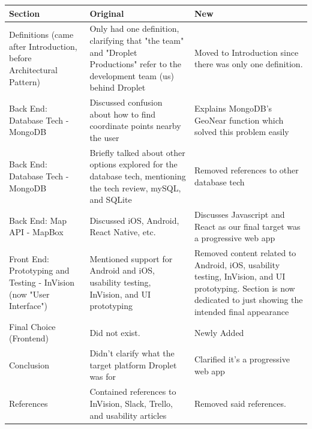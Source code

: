 \documentclass[draftclsnofoot, onecolumn, letterpaper,10pt,compsoc]{IEEEtran}
\begin{document}
\begin{tabularx}{\columnwidth}{X|X|X}
\textbf{Section} & \textbf{Original} & \textbf{New} \\ 
\hline

Definitions (came after Introduction, before Architectural Pattern) & 
Only had one definition, clarifying that "the team" and "Droplet Productions" refer to the development team (us) behind Droplet  & 
Moved to Introduction since there was only one definition. 
\\ \hline 

Back End: Database Tech - MongoDB  &
Discussed confusion about how to find coordinate points nearby the user &
Explains MongoDB's GeoNear function which solved this problem easily 
\\ \hline

Back End: Database Tech - MongoDB &
Briefly talked about other options explored for the database tech, mentioning the tech review, mySQL, and SQLite &
Removed references to other database tech
\\ \hline

Back End: Map API - MapBox &
Discussed iOS, Android, React Native, etc. &
Discusses Javascript and React as our final target was a progressive web app
\\ \hline

Front End: Prototyping and Testing - InVision (now "User Interface") &
Mentioned support for Android and iOS, usability testing, InVision, and UI prototyping &
Removed content related to Android, iOS, usability testing, InVision, and UI prototyping. Section is now dedicated to just showing the intended final appearance
\\ \hline

Final Choice (Frontend) & Did not exist. & Newly Added 
\\ \hline

Conclusion & 
Didn't clarify what the target platform Droplet was for & 
Clarified it's a progressive web app
\\ \hline

References &
Contained references to InVision, Slack, Trello, and usability articles &
Removed said references. 
\\ \hline



\end{tabularx}

\pagebreak
\end{document}
